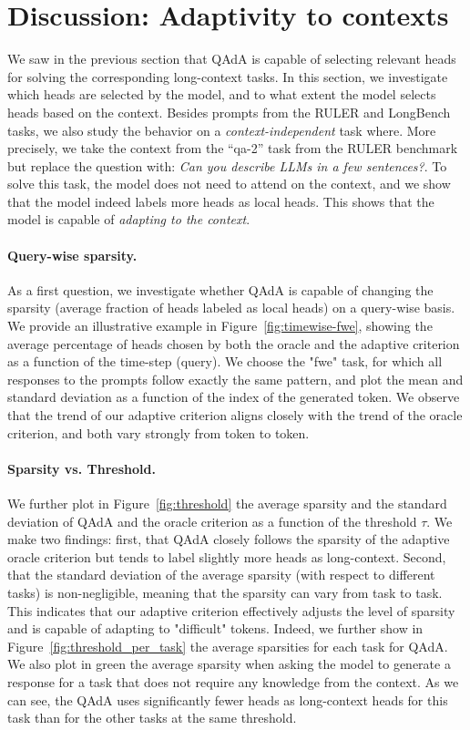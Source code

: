 \section{Discussion: Adaptivity to contexts}
\label{sec:rec}
We saw in the previous section that QAdA is capable of selecting relevant heads for solving the corresponding long-context tasks. In this section, we investigate which heads are selected by the model, and to what extent the model selects heads based on the context. Besides prompts from the RULER and LongBench tasks, we also study the behavior on a \textit{context-independent} task where. More precisely, we take the context from the ``qa-2'' task from the RULER benchmark but replace the question with: \textit{Can you describe LLMs in a few sentences?}. To solve this task, the model does not need to attend on the context, and we show that the model indeed labels more heads as local heads. This shows that the model is capable of \textit{adapting to the context}. 


\paragraph{Query-wise sparsity.} As a first question, we investigate whether QAdA is capable of changing the sparsity (average fraction of heads labeled as local heads) on a query-wise basis. We provide an illustrative example in Figure~\ref{fig:timewise-fwe}, showing the average percentage of heads chosen by both the oracle and the adaptive criterion as a function of the time-step (query). We choose the "fwe" task, for which all responses to the prompts follow exactly the same pattern, and plot the mean and standard deviation as a function of the index of the generated token.
We observe that the trend of our adaptive criterion aligns closely with the trend of the oracle criterion, and both vary strongly from token to token.

\paragraph{Sparsity vs. Threshold.} We further plot in Figure~\ref{fig:threshold} the average sparsity and the standard deviation of QAdA and the oracle criterion as a function of the threshold $\tau$.
We make two findings: first, that QAdA closely follows the sparsity of the adaptive oracle criterion but tends to label slightly more heads as long-context. Second, that the standard deviation of the average sparsity (with respect to different tasks) is non-negligible, meaning that the sparsity can vary from task to task. This indicates that our adaptive criterion effectively adjusts the level of sparsity and is capable of adapting to "difficult" tokens. Indeed, we further show in Figure~\ref{fig:threshold_per_task} the average sparsities for each task for QAdA. We also plot in green the average sparsity when asking the model to generate a response for a task that does not require any knowledge from the context. As we can see, the QAdA uses significantly fewer heads as long-context heads for this task than for the other tasks at the same threshold.




